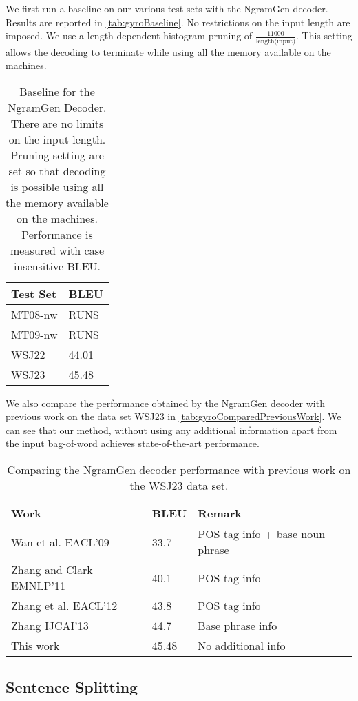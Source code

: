 We first run a baseline on our various test sets with the NgramGen decoder.
Results are reported in \autoref{tab:gyroBaseline}. No restrictions on the
input length are imposed. We use a length dependent histogram pruning of
$\frac{11000}{\text{length(input)}}$. This setting allows the decoding to terminate
while using all the memory available on the machines.
%
\begin{table}
  \begin{center}
  \begin{tabular}{l|l}
    Test Set & BLEU \\
    \hline
    MT08-nw & RUNS \\
    MT09-nw & RUNS \\
    WSJ22 & 44.01 \\
    WSJ23 & 45.48 \\
  \end{tabular}
  \caption{Baseline for the NgramGen Decoder. There are no limits on the input length. Pruning setting are set so that decoding is possible using
  all the memory available on the machines. Performance is measured with case insensitive BLEU.}
  \label{tab:gyroBaseline}
  \end{center}
\end{table}
%
We also compare the performance obtained by the NgramGen decoder with previous
work on the data set WSJ23 in \autoref{tab:gyroComparedPreviousWork}. We can
see that our method, without using any additional information apart from the
input bag-of-word achieves state-of-the-art performance.
%
\begin{table}
\begin{center}
  \begin{tabular}{l|l|l}
    Work & BLEU & Remark \\
    \hline
    Wan et al. EACL'09 & 33.7 & POS tag info + base noun phrase\\
    Zhang and Clark EMNLP'11 & 40.1 & POS tag info \\
    Zhang et al. EACL'12 & 43.8 & POS tag info \\
    Zhang IJCAI'13 & 44.7 & Base phrase info \\
    This work & 45.48 & No additional info
  \end{tabular}
\end{center}
\caption{Comparing the NgramGen decoder performance with previous work
  on the WSJ23 data set.}
\label{tab:gyroComparedPreviousWork}
\end{table}

\subsection{Sentence Splitting}

